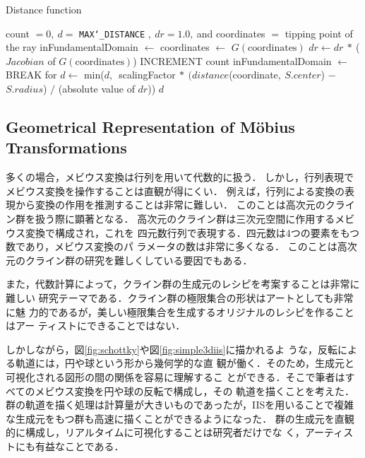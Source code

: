 \begin{algorithm}
 \caption{Distance function}
 \label{alg:iis3d}
 \begin{algorithmic}
  \REQUIRE count $= 0,~d = $ \texttt{MAX\char`_DISTANCE} $,~dr = 1.0,~$and coordinates $=$ tipping
  point of the ray
  \STATE inFundamentalDomain $\leftarrow$ \TRUE
  \STATE coordinates $\leftarrow$ $G(\text{coordinates})$
  \STATE $dr \leftarrow dr~*~$($Jacobian$ of $G(\text{coordinates})$)
  \STATE INCREMENT count
  \STATE inFundamentalDomain $\leftarrow$ \FALSE
  \ENDIF
  \ENDFOR
  \STATE BREAK for
  \ENDIF
  \ENDFOR
  \STATE $d \leftarrow$ min($d,$~scalingFactor$~*~(distance$(coordinate$,~S.center$) $-$
  $S.radius$) $/$ (absolute value of $dr$))
  \ENDFOR
  \RETURN $d$
 \end{algorithmic}
\end{algorithm}

\subsection{Geometrical Representation of M\"obius Transformations}

多くの場合，メビウス変換は行列を用いて代数的に扱う．
しかし，行列表現でメビウス変換を操作することは直観が得にくい．
例えば，行列による変換の表現から変換の作用を推測することは非常に難しい．
このことは高次元のクライン群を扱う際に顕著となる．
高次元のクライン群は三次元空間に作用するメビウス変換で構成され，これを
四元数行列で表現する．四元数は4つの要素をもつ数であり，メビウス変換のパ
ラメータの数は非常に多くなる．
このことは高次元のクライン群の研究を難しくしている要因でもある．

また，代数計算によって，クライン群の生成元のレシピを考案することは非常に難しい
研究テーマである．クライン群の極限集合の形状はアートとしても非常に魅
力的であるが，美しい極限集合を生成するオリジナルのレシピを作ることはアー
ティストにできることではない．

しかしながら，図\ref{fig:schottky}や図\ref{fig:simple3diis}に描かれるよ
うな，反転による軌道には，円や球という形から幾何学的な直
観が働く．そのため，生成元と可視化される図形の間の関係を容易に理解するこ
とができる．そこで筆者はすべてのメビウス変換を円や球の反転で構成し，その
軌道を描くことを考えた．
群の軌道を描く処理は計算量が大きいものであったが，IISを用いることで複雑
な生成元をもつ群も高速に描くことができるようになった．
群の生成元を直観的に構成し，リアルタイムに可視化することは研究者だけでな
く，アーティストにも有益なことである．

